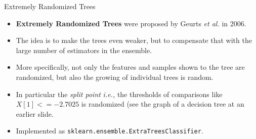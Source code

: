 \documentclass[10pt, aspectratio=169]{beamer} %
\begin{document}
\begin{frame}{Extremely Randomized Trees}
\begin{itemize}
	
	\item \textbf{Extremely Randomized Trees} were proposed by
	Geurts \emph{et al.} in 2006. 
	\item The idea is to make the trees even weaker, but to compensate that with the
	large number of estimators in the ensemble. 
	\item More specifically, not only the features and samples shown to the
	tree are randomized, but also the growing of individual trees is random.
	\item In particular the \emph{split point}
	\emph{i.e.,} the thresholds of comparisons like $X[1] <= -2.7025$ is randomized (see 
	the graph of a decision tree at an earlier slide.

\item Implemented as \texttt{sklearn.ensemble.ExtraTreesClassifier}.

\end{itemize}
\end{frame}
\end{document}
